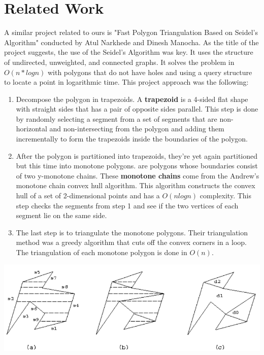 \documentclass[conference]{IEEEtran}
\begin{document}
\section{Related Work}
A similar project related to ours is "Fast Polygon Triangulation Based on Seidel's Algorithm"\cite{relatedProject} conducted by Atul Narkhede and Dinesh Manocha. As the title of the project suggests, the use of the Seidel's Algorithm was key. It uses the structure of undirected, unweighted, and connected graphs. It solves the problem in $O(n*logn)$ with polygons that do not have holes and using a query structure to locate a point in logarithmic time. This project approach was the following:
\begin{enumerate}
    \item Decompose the polygon in trapezoids. A \textbf{trapezoid} is a 4-sided flat shape with straight sides that has a pair of opposite sides parallel. This step is done by randomly selecting a segment from a set of segments that are non-horizontal and non-intersecting from the polygon and adding them incrementally to form the trapezoids inside the boundaries of the polygon.
    \item After the polygon is partitioned into trapezoids, they're yet again partitioned but this time into monotone polygons.  are polygons whose boundaries consist of two y-monotone chains. These \textbf{monotone chains} come from the Andrew's monotone chain convex hull algorithm. This algorithm constructs the convex hull of a set of 2-dimensional points and has a $O(nlogn)$ complexity. This step checks the segments from step 1 and see if the two vertices of each segment lie on the same side.
    \item The last step is to triangulate the monotone polygons. Their triangulation method was a greedy algorithm that cuts off the convex corners in a loop. The triangulation of each monotone polygon is done in $O(n)$.
\end{enumerate}
\centering
\includegraphics[scale=0.5]{relatedWork}
\end{document}
